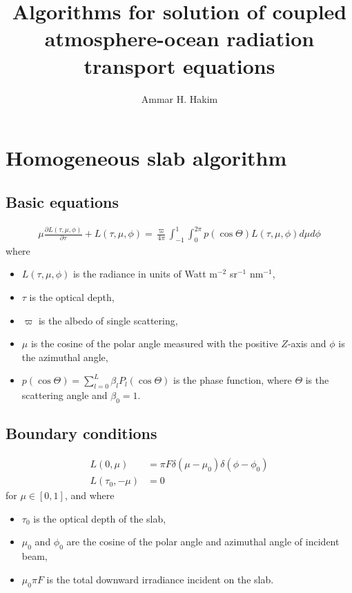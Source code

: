 \documentclass[11pt]{article}
\title{Algorithms for solution of coupled atmosphere-ocean radiation
  transport equations}%
\author{Ammar H. Hakim}%
\date{}
\newcommand{\pfrac}[2]{\frac{\partial #1}{\partial #2}}
\begin{document}
\maketitle

\section{Homogeneous slab algorithm}

\subsection{Basic equations}
\begin{align}
  \mu\pfrac{L(\tau,\mu,\phi)}{\tau} + L(\tau,\mu,\phi)
  =
  \frac{\varpi}{4\pi}
  \int_{-1}^1 \int_0^{2\pi}
  p(\cos\Theta) L(\tau,\mu,\phi) d\mu d\phi
\end{align}
where
\begin{itemize}
\item $L(\tau,\mu,\phi)$ is the radiance in units of Watt m$^{-2}$
  sr$^{-1}$ nm$^{-1}$,
\item $\tau$ is the optical depth,
\item $\varpi$ is the albedo of single scattering,
\item $\mu$ is the cosine of the polar angle measured with the
  positive $Z$-axis and $\phi$ is the azimuthal angle,
\item $p(\cos\Theta) = \sum_{l=0}^L\beta_lP_l(\cos\Theta)$ is the
  phase function, where $\Theta$ is the scattering angle and
  $\beta_0=1$.
\end{itemize}




\subsection{Boundary conditions}
\begin{align}
  L(0, \mu) &= \pi F \delta(\mu-\mu_0) \delta(\phi-\phi_0) \\
  L(\tau_0, -\mu) &= 0
\end{align}
for $\mu\in [0,1]$, and where
\begin{itemize}
\item $\tau_0$ is the optical depth of the slab,
\item $\mu_0$ and $\phi_0$ are the cosine of the polar angle and
  azimuthal angle of incident beam,
\item $\mu_0\pi F$ is the total downward irradiance incident on the
  slab.
\end{itemize}
\end{document}
